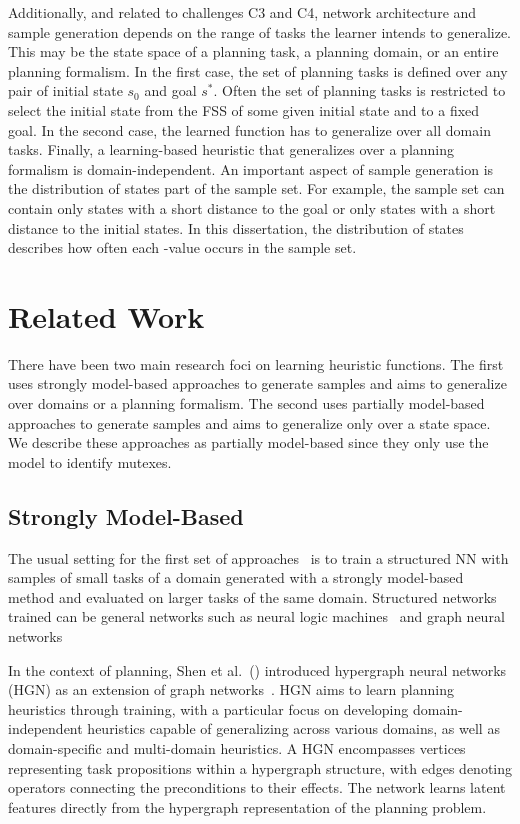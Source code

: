 Additionally, and related to challenges C3 and C4, network architecture and sample generation depends on the range of tasks the learner intends to generalize. This may be the state space of a planning task, a planning domain, or an entire planning formalism. In the first case, the set of planning tasks is defined over any pair of initial state $s_0$ and goal $s^*$. Often the set of planning tasks is restricted to select the initial state from the FSS of some given initial state and to a fixed goal. In the second case, the learned function has to generalize over all domain tasks. Finally, a learning-based heuristic that generalizes over a planning formalism is domain-independent. An important aspect of sample generation is the distribution of states part of the sample set. For example, the sample set can contain only states with a short distance to the goal or only states with a short distance to the initial states. In this dissertation, the distribution of states describes how often each \hstar-value occurs in the sample set.

\section{Related Work}
\label{sec:background_relatedwork}

There have been two main research foci on learning heuristic functions. The first uses strongly model-based approaches to generate samples and aims to generalize over domains or a planning formalism. The second uses partially model-based approaches to generate samples and aims to generalize only over a state space. We describe these approaches as partially model-based since they only use the model to identify mutexes.

\subsection{Strongly Model-Based}

The usual setting for the first set of approaches~\cite{Toyer.etal/2018,Shen.etal/2020,Toyer.etal/2020,Gehring.etal/2022,Stahlberg.etal/2022} is to train a structured NN with samples of small tasks of a domain generated with a strongly model-based method and evaluated on larger tasks of the same domain. Structured networks trained can be general networks such as neural logic machines~\cite{Dong.etal/2018} and graph neural networks~\cite{Gori.etal/2005,Scarselli.etal/2008}

In the context of planning, Shen et al.~(\citeyear{Shen.etal/2020}) introduced hypergraph neural networks (HGN) as an extension of graph networks~\cite{Battaglia.etal/2018}. HGN aims to learn planning heuristics through training, with a particular focus on developing domain-independent heuristics capable of generalizing across various domains, as well as domain-specific and multi-domain heuristics. A HGN encompasses vertices representing task propositions within a hypergraph structure, with edges denoting operators connecting the preconditions to their effects. The network learns latent features directly from the hypergraph representation of the planning problem.


